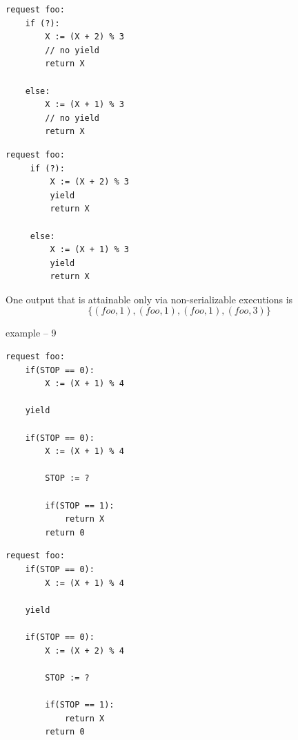 \noindent
\begin{minipage}[t]{0.45\textwidth}
	\begin{lstlisting}[caption={foo (serializable)}]
request foo: 
    if (?):
        X := (X + 2) % 3 
        // no yield
        return X

    else:
        X := (X + 1) % 3
        // no yield
        return X
	\end{lstlisting}
\end{minipage}
\hfill
\begin{minipage}[t]{0.45\textwidth}
\begin{lstlisting}[caption={foo (non serializable)}]
request foo: 
     if (?):
         X := (X + 2) % 3 
         yield
         return X

     else:
         X := (X + 1) % 3
         yield
         return X
	\end{lstlisting}
\end{minipage}

One output that is attainable only via non-serializable executions is 
\[
\{(foo,1),(foo,1),(foo,1),(foo,3)\}
\]


\newpage


example – 9

\noindent
\begin{minipage}[t]{0.45\textwidth}
	\begin{lstlisting}[caption={foo (serializable)}]
request foo:
    if(STOP == 0):
        X := (X + 1) % 4

    yield

    if(STOP == 0):
        X := (X + 1) % 4

        STOP := ?
        
        if(STOP == 1):
	        return X
        return 0
	\end{lstlisting}
\end{minipage}
\hfill
\begin{minipage}[t]{0.45\textwidth}
	\begin{lstlisting}[caption={foo (non serializable)}]
request foo:
    if(STOP == 0):
        X := (X + 1) % 4

    yield

    if(STOP == 0):
        X := (X + 2) % 4

        STOP := ?
        
        if(STOP == 1):
	        return X
        return 0
	\end{lstlisting}
\end{minipage}




\newpage